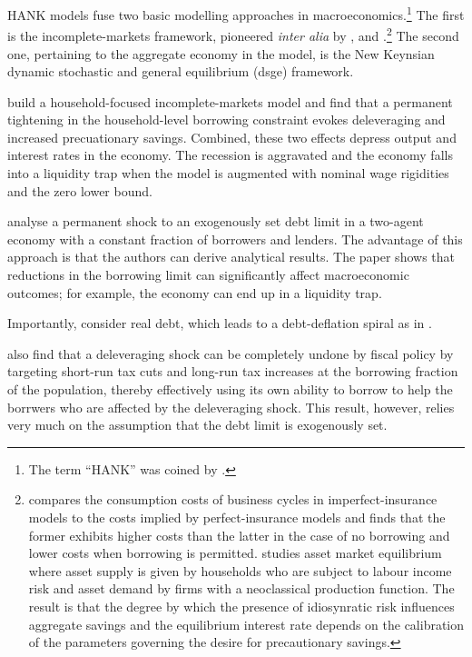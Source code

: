 \documentclass[12pt]{article}
\numberwithin{equation}{section} %
\begin{document}
HANK models fuse two basic modelling approaches in macroeconomics.\footnote{The term \enquote{HANK} was coined by \textcite{kaplan2018}.} The first is the incomplete-markets framework, pioneered \textit{inter alia} by \textcite{im1989}, \textcite{huggett1993} and \textcite{aiyagari1994}.\footnote{\textcite{im1989} compares the consumption costs of business cycles in imperfect-insurance models to the costs implied by perfect-insurance models and finds that the former exhibits higher costs than the latter in the case of no borrowing and lower costs when borrowing is permitted. \textcite{aiyagari1994} studies asset market equilibrium where asset supply is given by households who are subject to labour income risk and asset demand by firms with a neoclassical production function. The result is that the degree by which the presence of idiosynratic risk influences aggregate savings and the equilibrium interest rate depends on the calibration of the parameters governing the desire for precautionary savings.} The second one, pertaining to the aggregate economy in the model, is the New Keynsian dynamic stochastic and general equilibrium (\Gls{dsge}) framework.

\textcite{gl2017} build a household-focused incomplete-markets model and find that a permanent tightening in the household-level borrowing constraint evokes deleveraging and increased precuationary savings. Combined, these two effects depress output and interest rates in the economy. The recession is aggravated and the economy falls into a liquidity trap when the model is augmented with nominal wage rigidities and the zero lower bound. 

\textcite{egg2012} analyse a permanent shock to an exogenously set debt limit in a two-agent economy with a constant fraction of borrowers and lenders. The advantage of this approach is that the authors can derive analytical results. The paper shows that reductions in the borrowing limit can significantly affect macroeconomic outcomes; for example, the economy can end up in a liquidity trap.

Importantly, \textcite{egg2012} consider real debt, which leads to a debt-deflation spiral as in \textcite{fisher1933}.

\textcite{egg2012} also find that a deleveraging shock can be completely undone by fiscal policy by targeting short-run tax cuts and long-run tax increases at the borrowing fraction of the population, thereby effectively using its own ability to borrow to help the borrwers who are affected by the deleveraging shock. This result, however, relies very much on the assumption that the debt limit is exogenously set.
\end{document}
